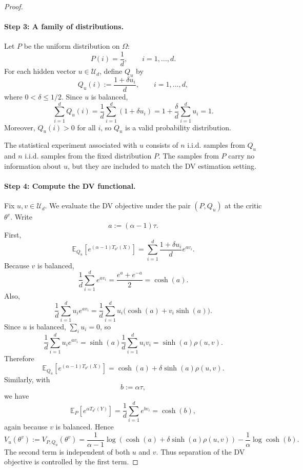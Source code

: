 \documentclass{article}
\theoremstyle{plain}
\theoremstyle{definition}
\theoremstyle{remark}
\begin{document}
\begin{proof}
\paragraph{Step 3: A family of distributions.}
Let \(P\) be the uniform distribution on \(\Omega\):
\[
    P(i)=\frac1d,\qquad i=1,\ldots,d.
\]
For each hidden vector \(u\in\mathcal U_d\), define \(Q_u\) by
\[
    Q_u(i):=\frac{1+\delta u_i}{d},
    \qquad i=1,\ldots,d,
\]
where \(0<\delta\le 1/2\). Since \(u\) is balanced,
\[
    \sum_{i=1}^d Q_u(i)
    =
    \frac1d\sum_{i=1}^d (1+\delta u_i)
    =
    1+\frac{\delta}{d}\sum_{i=1}^d u_i
    =
    1.
\]
Moreover, \(Q_u(i)>0\) for all \(i\), so \(Q_u\) is a valid probability
distribution.

The statistical experiment associated with \(u\) consists of \(n\) i.i.d.
samples from \(Q_u\) and \(n\) i.i.d. samples from the fixed distribution \(P\).
The samples from \(P\) carry no information about \(u\), but they are included
to match the DV estimation setting.

\paragraph{Step 4: Compute the DV functional.}
Fix \(u,v\in\mathcal U_d\). We evaluate the DV objective under the pair
\((P,Q_u)\) at the critic \(\theta^v\). Write
\[
    a:=(\alpha-1)\tau.
\]
First,
\[
    \mathbb E_{Q_u}\!\left[e^{(\alpha-1)T_{\theta^v}(X)}\right]
    =
    \sum_{i=1}^d \frac{1+\delta u_i}{d} e^{a v_i}.
\]
Because \(v\) is balanced,
\[
    \frac1d\sum_{i=1}^d e^{a v_i}
    =
    \frac{e^a+e^{-a}}{2}
    =
    \cosh(a).
\]
Also,
\[
    \frac1d\sum_{i=1}^d u_i e^{a v_i}
    =
    \frac1d\sum_{i=1}^d u_i\bigl(\cosh(a)+v_i\sinh(a)\bigr).
\]
Since \(u\) is balanced, \(\sum_i u_i=0\), so
\[
    \frac1d\sum_{i=1}^d u_i e^{a v_i}
    =
    \sinh(a)\frac1d\sum_{i=1}^d u_i v_i
    =
    \sinh(a)\rho(u,v).
\]
Therefore
\[
    \mathbb E_{Q_u}\!\left[e^{(\alpha-1)T_{\theta^v}(X)}\right]
    =
    \cosh(a)+\delta\sinh(a)\rho(u,v).
\]
Similarly, with
\[
    b:=\alpha\tau,
\]
we have
\[
    \mathbb E_P\!\left[e^{\alpha T_{\theta^v}(Y)}\right]
    =
    \frac1d\sum_{i=1}^d e^{b v_i}
    =
    \cosh(b),
\]
again because \(v\) is balanced. Hence
\[
    V_u(\theta^v)
    :=
    V_{P,Q_u}(\theta^v)
    =
    \frac{1}{\alpha-1}
    \log\!\left(\cosh(a)+\delta\sinh(a)\rho(u,v)\right)
    -
    \frac1\alpha\log\cosh(b).
\]
The second term is independent of both \(u\) and \(v\). Thus separation of the
DV objective is controlled by the first term.


\end{proof}
\end{document}

